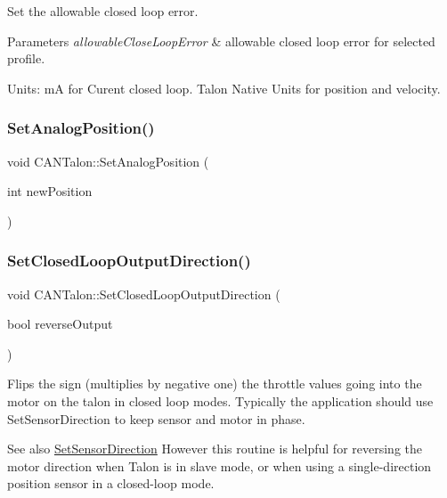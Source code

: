 Set the allowable closed loop error.


\begin{DoxyParams}{Parameters}
{\em allowable\+Close\+Loop\+Error} & allowable closed loop error for selected profile.\\
\hline
\end{DoxyParams}
Units\+: mA for Curent closed loop. Talon Native Units for position and velocity. \mbox{\label{class_c_a_n_talon_a2893e5777fc2904d9aeab91c283d19df}} 
\subsubsection{\texorpdfstring{Set\+Analog\+Position()}{SetAnalogPosition()}}
{\footnotesize\ttfamily void C\+A\+N\+Talon\+::\+Set\+Analog\+Position (\begin{DoxyParamCaption}\item[{int}]{new\+Position }\end{DoxyParamCaption})\hspace{0.3cm}{\ttfamily [virtual]}}

\mbox{\label{class_c_a_n_talon_a17842e8f2d2fbcf8cc14558ebc83c48b}} 
\subsubsection{\texorpdfstring{Set\+Closed\+Loop\+Output\+Direction()}{SetClosedLoopOutputDirection()}}
{\footnotesize\ttfamily void C\+A\+N\+Talon\+::\+Set\+Closed\+Loop\+Output\+Direction (\begin{DoxyParamCaption}\item[{bool}]{reverse\+Output }\end{DoxyParamCaption})}

Flips the sign (multiplies by negative one) the throttle values going into the motor on the talon in closed loop modes. Typically the application should use Set\+Sensor\+Direction to keep sensor and motor in phase. \begin{DoxySeeAlso}{See also}
\hyperlink{class_c_a_n_talon_a11381d58bbcd47c3fb2235fd76161ff2}{Set\+Sensor\+Direction} However this routine is helpful for reversing the motor direction when Talon is in slave mode, or when using a single-\/direction position sensor in a closed-\/loop mode.
\end{DoxySeeAlso}

